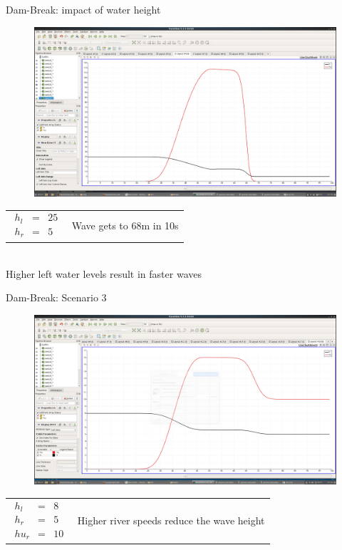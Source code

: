 \documentclass[shortpres]{beamer}
\newcommand{\imgvoffset}{-20pt}
\newcommand{\imgfullscale}{0.75}
\begin{document}
\begin{frame}{Dam-Break: impact of water height}
	\begin{figure}[t]
		\vspace{\imgvoffset}
		\includegraphics[width=\imgfullscale\linewidth]{img/Dam_hl25_hr5.png}
	\end{figure}
	
	\begin{tabular}{m{3cm} m{\linewidth-5cm}}
		$
		\begin{matrix}
		h_l & = & 25\\
		h_r & = & 5
		\end{matrix}
		$
		&
		Wave gets to 68m in 10s
	\end{tabular}
	 \hspace{0pt}\\
	 \centering
	 Higher left water levels result in faster waves
\end{frame}


\begin{frame}{Dam-Break: Scenario 3}
	\begin{figure}[t]
		\vspace{\imgvoffset}
		\includegraphics[width=\imgfullscale\linewidth]{img/Dam_river.png}
	\end{figure}
	
	\begin{tabular}{m{3cm} m{\linewidth-5cm}}
		$
		\begin{matrix}
		h_l & = & 8\\
		h_r & = & 5\\
		hu_r & = & 10
		\end{matrix}
		$
		&
		
		Higher river speeds reduce the wave height
	\end{tabular}
\end{frame}
\end{document}
